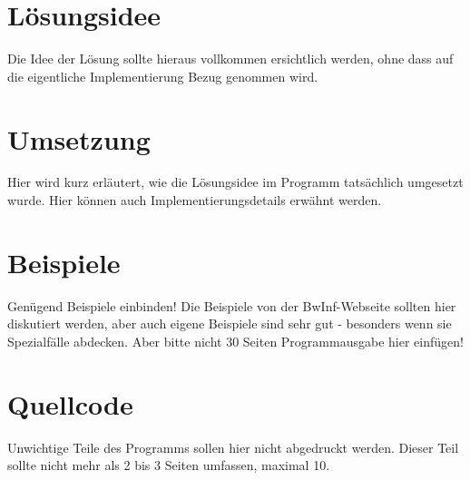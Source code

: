 
\maketitle
\tableofcontents

\vspace{0.5cm}


\section{Lösungsidee}\label{sec:losungsidee}
Die Idee der Lösung sollte hieraus vollkommen ersichtlich werden, ohne dass auf die eigentliche Implementierung Bezug genommen wird.


\section{Umsetzung}\label{sec:umsetzung}
Hier wird kurz erläutert, wie die Lösungsidee im Programm tatsächlich umgesetzt wurde.
Hier können auch Implementierungsdetails erwähnt werden.


\section{Beispiele}\label{sec:beispiele}
Genügend Beispiele einbinden!
Die Beispiele von der BwInf-Webseite sollten hier diskutiert werden, aber auch eigene Beispiele sind sehr gut - besonders wenn sie Spezialfälle abdecken.
Aber bitte nicht 30 Seiten Programmausgabe hier einfügen!


\section{Quellcode}\label{sec:quellcode}
Unwichtige Teile des Programms sollen hier nicht abgedruckt werden.
Dieser Teil sollte nicht mehr als 2 bis 3 Seiten umfassen, maximal 10.

